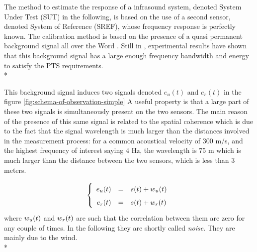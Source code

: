 The method to estimate the response of a infrasound system, denoted System Under Test (SUT) in the following, is based on the use of a second sensor, denoted System of Reference (SREF), whose frequency response is perfectly known. The calibration method is based on the presence of a quasi permanent background signal all over the Word \cite{?}.  Still in \cite{?}, experimental results have shown that this background signal has a large enough frequency bandwidth and energy to satisfy the PTS requirements. \\*


This  background signal  induces two  signals denoted $e_{u}(t)$ and $e_{r}(t)$ in the figure \ref{fig:schema-of-observation-simple}
A useful property is that a large part of these two signals is simultaneously present  on the two sensors. The main reason of the presence of this same signal is related to the spatial coherence which is due to the fact that the signal wavelength is much larger than the distances  involved in the measurement process: for a common acoustical velocity of $300$ m/s, and the highest frequency of interest saying $4$ Hz, the wavelength is $75$ m which is much larger than the distance between the two sensors, which is less than 3 meters. 

\begin{eqnarray}
\label{eq:model-signal-introduction}
\left\{
\renewcommand\arraystretch{1.6}
\begin{array}{rcl}
e_{\ut}(t)&=&s(t)+w_{\ut}(t)
\\
e_{\rf}(t)&=&s(t)+w_{\rf}(t)
\end{array}
\right.
\end{eqnarray}
where $w_{{u}}(t)$ and $w_{{r}}(t)$ are such that the correlation between them are zero for any couple of times. In the following they are shortly called \emph{noise}.  They are mainly due to the wind.\\*


